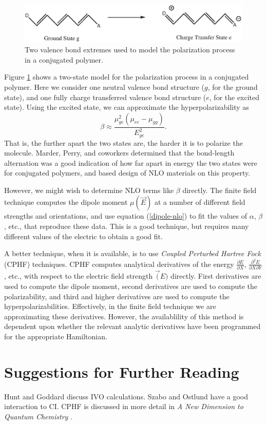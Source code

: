\begin{figure}
\begin{center}
\includegraphics[scale=0.5]{polymer_nlo.eps}
\end{center}
\caption{Two valence bond extremes used to model the polarization
process in a conjugated polymer.}
\label{polymer_nlo}
\end{figure}

Figure \ref{polymer_nlo} shows a two-state model for the polarization
process in a conjugated polymer. Here we consider one neutral valence
bond structure ($g$, for the ground state), and one fully charge
transferred valence bond structure ($e$, for the excited state). Using
the excited state, we can approximate the hyperpolarizability as
\begin{equation}
 \beta \approx \frac{\mu_{ge}^2(\mu_{ee}-\mu_{gg})}{E_{ge}^2}.
\end{equation}
That is, the further apart the two states are, the harder it is to
polarize the molecule. Marder, Perry, and coworkers determined that
the bond-length alternation was a good indication of how far apart in
energy the two states were for conjugated polymers, and based design
of NLO materials on this property.

However, we might wish to determine NLO terms like $\beta$ directly.
The finite field technique computes the dipole moment $\mu(\vec{E})$
at a number of different field strengths and orientations, and use
equation (\ref{dipole-nlo}) to fit the values of $\alpha$, $\beta$,
etc., that reproduce these data. This is a good technique, but
requires many different values of the electric to obtain a good fit.

A better technique, when it is available, is to use \emph{Coupled
Perturbed Hartree Fock} (CPHF) techniques. CPHF computes analytical
derivatives of the energy $\frac{\partial E}{\partial X}$, 
$\frac{\partial^2 E}{\partial X\partial Y}$, etc., with respect to the
electric field strength $\vec(E)$ directly. First derivatives are used
to compute the dipole moment, second derivatives are used to compute
the polarizability, and third and higher derivatives are used to
compute the hyperpolarizabilities. Effectively, in the finite
field technique we are approximating these derivatives. However, the
availablility of this method is dependent upon whether the relevant
analytic derivatives have been programmed for the appropriate
Hamiltonian. 

\section{Suggestions for Further Reading}
Hunt and Goddard \cite{Hunt69} discuss IVO calculations. Szabo and
Ostlund \cite{Szabo82} have a good interaction to CI.  CPHF is
discussed in more detail in \emph{A New Dimension to Quantum
Chemistry} \cite{Yamaguchi94}.



